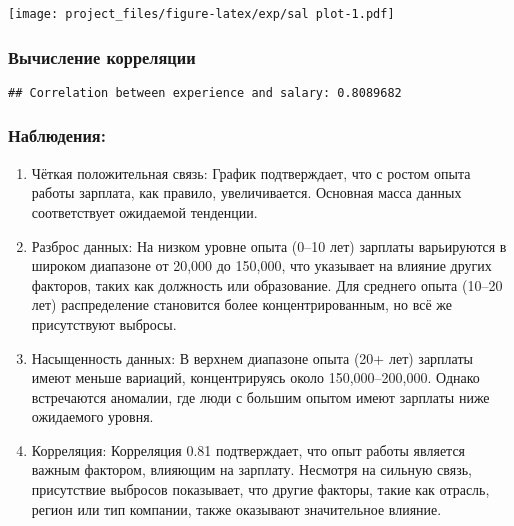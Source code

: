 \documentclass[
]{article}
\newenvironment{Shaded}{\begin{snugshade}}{\end{snugshade}}
\newcommand{\AttributeTok}[1]{\textcolor[rgb]{0.13,0.29,0.53}{#1}}
\newcommand{\CommentTok}[1]{\textcolor[rgb]{0.56,0.35,0.01}{\textit{#1}}}
\newcommand{\FunctionTok}[1]{\textcolor[rgb]{0.13,0.29,0.53}{\textbf{#1}}}
\newcommand{\NormalTok}[1]{#1}
\newcommand{\OtherTok}[1]{\textcolor[rgb]{0.56,0.35,0.01}{#1}}
\newcommand{\SpecialCharTok}[1]{\textcolor[rgb]{0.81,0.36,0.00}{\textbf{#1}}}
\newcommand{\StringTok}[1]{\textcolor[rgb]{0.31,0.60,0.02}{#1}}
\begin{document}
\texttt{[image: project\_files/figure-latex/exp/sal plot-1.pdf]}

\subsubsection{Вычисление
корреляции}\label{ux432ux44bux447ux438ux441ux43bux435ux43dux438ux435-ux43aux43eux440ux440ux435ux43bux44fux446ux438ux438}

\begin{Shaded}
\end{Shaded}

\begin{verbatim}
## Correlation between experience and salary: 0.8089682
\end{verbatim}

\subsubsection{Наблюдения:}\label{ux43dux430ux431ux43bux44eux434ux435ux43dux438ux44f-10}

\begin{enumerate}
\def\labelenumi{\arabic{enumi}.}
\item
  Чёткая положительная связь: График подтверждает, что с ростом опыта
  работы зарплата, как правило, увеличивается. Основная масса данных
  соответствует ожидаемой тенденции.
\item
  Разброс данных: На низком уровне опыта (0--10 лет) зарплаты
  варьируются в широком диапазоне от 20,000 до 150,000, что указывает на
  влияние других факторов, таких как должность или образование. Для
  среднего опыта (10--20 лет) распределение становится более
  концентрированным, но всё же присутствуют выбросы.
\item
  Насыщенность данных: В верхнем диапазоне опыта (20+ лет) зарплаты
  имеют меньше вариаций, концентрируясь около 150,000--200,000. Однако
  встречаются аномалии, где люди с большим опытом имеют зарплаты ниже
  ожидаемого уровня.
\item
  Корреляция: Корреляция 0.81 подтверждает, что опыт работы является
  важным фактором, влияющим на зарплату. Несмотря на сильную связь,
  присутствие выбросов показывает, что другие факторы, такие как
  отрасль, регион или тип компании, также оказывают значительное
  влияние.
\end{enumerate}
\end{document}
